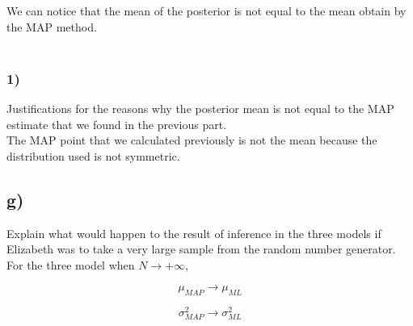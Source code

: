 \documentclass[12pt,twoside]{article}
\begin{document}
We can notice that the mean of the posterior is not equal to the mean obtain by the MAP method.\\\\

\subsubsection*{1)} Justifications for the reasons why the posterior mean is not equal to the MAP estimate that we found in the previous part.\\
The MAP point that we calculated previously  is not the mean because the distribution used is not symmetric.


\subsection*{g)} Explain what would happen to the result of inference in the three models if Elizabeth was to take a very large sample from the random number generator.\\

For the three model when $N \rightarrow  +\infty$, 

\begin{equation*}
\mu_{MAP} \rightarrow \mu_{ML} 
\end{equation*}


\begin{equation*}
\sigma_{MAP}^2 \rightarrow \sigma_{ML}^2 
\end{equation*}
\end{document}
